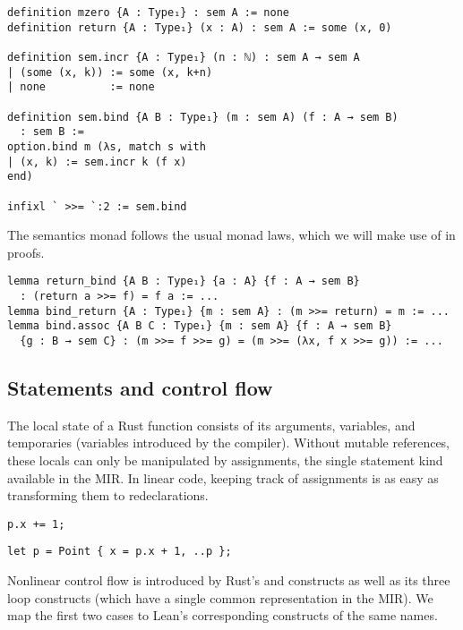 \begin{verbatim}
definition mzero {A : Type₁} : sem A := none
definition return {A : Type₁} (x : A) : sem A := some (x, 0)

definition sem.incr {A : Type₁} (n : ℕ) : sem A → sem A
| (some (x, k)) := some (x, k+n)
| none          := none

definition sem.bind {A B : Type₁} (m : sem A) (f : A → sem B)
  : sem B :=
option.bind m (λs, match s with
| (x, k) := sem.incr k (f x)
end)

infixl ` >>= `:2 := sem.bind
\end{verbatim}

The semantics monad follows the usual monad laws, which we will make use of in proofs.

\begin{verbatim}
lemma return_bind {A B : Type₁} {a : A} {f : A → sem B}
  : (return a >>= f) = f a := ...
lemma bind_return {A : Type₁} {m : sem A} : (m >>= return) = m := ...
lemma bind.assoc {A B C : Type₁} {m : sem A} {f : A → sem B}
  {g : B → sem C} : (m >>= f >>= g) = (m >>= (λx, f x >>= g)) := ...
\end{verbatim}

\subsection{Statements and control flow}

The local state of a Rust function consists of its arguments, variables, and
temporaries (variables introduced by the compiler). Without mutable references,
these locals can only be manipulated by assignments, the single statement kind
available in the MIR. In linear code, keeping track of assignments is as easy as
transforming them to redeclarations.

\vspace{1em}\noindent\begin{minipage}{0.4\textwidth}
  \begin{verbatim}
p.x += 1;
  \end{verbatim}
\end{minipage}
\begin{minipage}{0.6\textwidth}
  \begin{verbatim}
let p = Point { x = p.x + 1, ..p };
  \end{verbatim}
\end{minipage}\vspace{1em}

Nonlinear control flow is introduced by Rust's  and 
constructs as well as its three loop constructs (which have a single common
representation in the MIR). We map the first two cases to Lean's corresponding
constructs of the same names.

